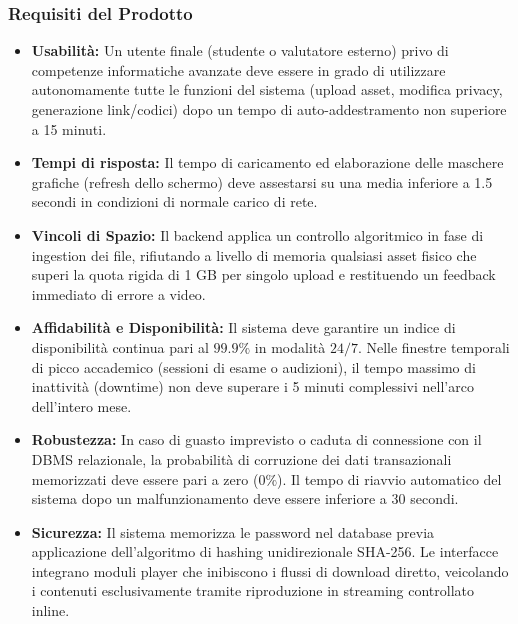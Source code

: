 \documentclass[12pt,a4paper]{article}
\begin{document}
\subsubsection{Requisiti del Prodotto}
\begin{itemize}
    \item \textbf{Usabilità:} Un utente finale (studente o valutatore esterno) privo di competenze informatiche avanzate deve essere in grado di utilizzare autonomamente tutte le funzioni del sistema (upload asset, modifica privacy, generazione link/codici) dopo un tempo di auto-addestramento non superiore a 15 minuti.
    \item \textbf{Tempi di risposta:} Il tempo di caricamento ed elaborazione delle maschere grafiche (refresh dello schermo) deve assestarsi su una media inferiore a 1.5 secondi in condizioni di normale carico di rete.
    \item \textbf{Vincoli di Spazio:} Il backend applica un controllo algoritmico in fase di ingestion dei file, rifiutando a livello di memoria qualsiasi asset fisico che superi la quota rigida di 1 GB per singolo upload e restituendo un feedback immediato di errore a video.
    \item \textbf{Affidabilità e Disponibilità:} Il sistema deve garantire un indice di disponibilità continua pari al $99.9\%$ in modalità $24/7$. Nelle finestre temporali di picco accademico (sessioni di esame o audizioni), il tempo massimo di inattività (downtime) non deve superare i 5 minuti complessivi nell'arco dell'intero mese.
    \item \textbf{Robustezza:} In caso di guasto imprevisto o caduta di connessione con il DBMS relazionale, la probabilità di corruzione dei dati transazionali memorizzati deve essere pari a zero ($0\%$). Il tempo di riavvio automatico del sistema dopo un malfunzionamento deve essere inferiore a 30 secondi.
    \item \textbf{Sicurezza:} Il sistema memorizza le password nel database previa applicazione dell'algoritmo di hashing unidirezionale SHA-256. Le interfacce integrano moduli player che inibiscono i flussi di download diretto, veicolando i contenuti esclusivamente tramite riproduzione in streaming controllato inline.
\end{itemize}
\end{document}
